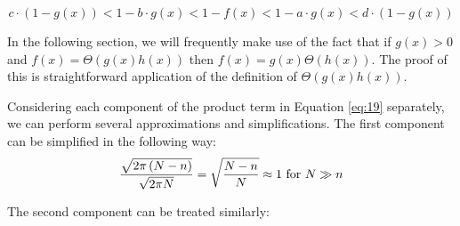 \documentclass{article}
\theoremstyle{definition}
\begin{document}
$$c \cdot (1-g(x))<1-b\cdot g(x)< 1-f(x)<1-a\cdot g(x)<d \cdot (1-g(x))$$ 

\noindent In the following section, we will frequently make use of the fact that if $g(x)>0$ and $f(x)=\Theta{\left(g(x)h(x)\right)}$ then $f(x)=g(x)\Theta{\left(h(x)\right)}$. The proof of this is straightforward application of the definition of $\Theta{\left(g(x)h(x)\right)}$.


 Considering each component of the product term in Equation \ref{eq:19} separately, we can perform several approximations and simplifications. The first component can be simplified in the following way:
\begin{equation}
    \frac{\sqrt{2\pi \left(N-n\right)}}{\sqrt{2\pi N}}=\sqrt{\frac{N-n}{N}}\approx 1 \text{ for } N \gg n \nonumber\\
    \end{equation}

\noindent The second component can be treated similarly:
\end{document}

